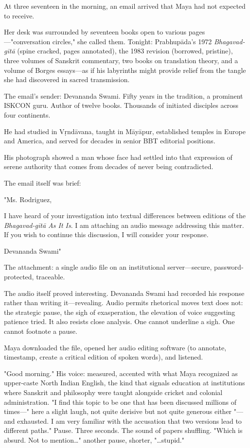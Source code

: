 \documentclass[12pt,twoside]{book}
\begin{document}
\normalfont\justifying
At three seventeen in the morning, an email arrived that Maya had not expected to receive.

Her desk was surrounded by seventeen books open to various pages—"conversation circles," she called them. Tonight: Prabhupāda's 1972 \emph{Bhagavad-gītā} (spine cracked, pages annotated), the 1983 revision (borrowed, pristine), three volumes of Sanskrit commentary, two books on translation theory, and a volume of Borges essays—as if his labyrinths might provide relief from the tangle she had discovered in sacred transmission.

The email's sender: Devananda Swami. Fifty years in the tradition, a prominent ISKCON guru. Author of twelve books. Thousands of initiated disciples across four continents.

He had studied in Vṛndāvana, taught in Māyāpur, established temples in Europe and America, and served for decades in senior BBT editorial positions.

His photograph showed a man whose face had settled into that expression of serene authority that comes from decades of never being contradicted.

The email itself was brief:

"Ms. Rodriguez,

I have heard of your investigation into textual differences between editions of the \emph{Bhagavad-gītā As It Is}. I am attaching an audio message addressing this matter. If you wish to continue this discussion, I will consider your response.

Devananda Swami"

The attachment: a single audio file on an institutional server—secure, password-protected, traceable.

The audio itself proved interesting. Devananda Swami had recorded his response rather than writing it—revealing. Audio permits rhetorical moves text does not: the strategic pause, the sigh of exasperation, the elevation of voice suggesting patience tried. It also resists close analysis. One cannot underline a sigh. One cannot footnote a pause.

Maya downloaded the file, opened her audio editing software (to annotate, timestamp, create a critical edition of spoken words), and listened.

"Good morning." His voice: measured, accented with what Maya recognized as upper-caste North Indian English, the kind that signals education at institutions where Sanskrit and philosophy were taught alongside cricket and colonial administration. "I find this topic to be one that has been discussed millions of times—" here a slight laugh, not quite derisive but not quite generous either "—and exhausted. I am very familiar with the accusation that two versions lead to different paths." Pause. Three seconds. The sound of papers shuffling. "Which is absurd. Not to mention\ldots{}" another pause, shorter, "\ldots{}stupid."
\end{document}
